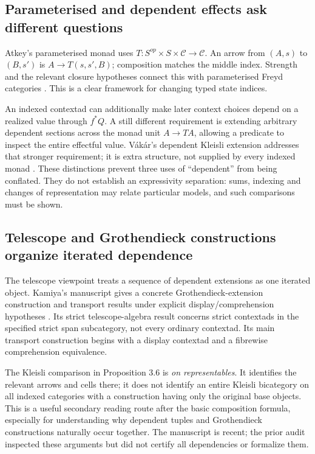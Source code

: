 \documentclass[11pt,letterpaper]{article}
\begin{document}
\subsection{Parameterised and dependent effects ask different questions}
Atkey's parameterised monad uses $T:S^{op}\times S\times\mathcal C\to\mathcal C$. An arrow from $(A,s)$ to $(B,s')$ is $A\to T(s,s',B)$; composition matches the middle index. Strength and the relevant closure hypotheses connect this with parameterised Freyd categories \cite[Definition 1, Propositions 1--3, Theorem 1]{Atkey}. This is a clear framework for changing typed state indices.

An indexed contextad can additionally make later context choices depend on a realized value through $f^*Q$. A still different requirement is extending arbitrary dependent sections across the monad unit $A\to TA$, allowing a predicate to inspect the entire effectful value. V\'ak\'ar's dependent Kleisli extension addresses that stronger requirement; it is extra structure, not supplied by every indexed monad \cite[Definition 5.3.2 and Sections 5.3.3.1--5.3.3.3]{Vakar}. These distinctions prevent three uses of ``dependent'' from being conflated. They do not establish an expressivity separation: sums, indexing and changes of representation may relate particular models, and such comparisons must be shown.

\subsection{Telescope and Grothendieck constructions organize iterated dependence}
The telescope viewpoint treats a sequence of dependent extensions as one iterated object. Kamiya's manuscript gives a concrete Grothendieck-extension construction and transport results under explicit display/comprehension hypotheses \cite[Proposition 3.2, Proposition 3.5, Theorem 4.2]{Kamiya}. Its strict telescope-algebra result concerns strict contextads in the specified strict span subcategory, not every ordinary contextad. Its main transport construction begins with a display contextad and a fibrewise comprehension equivalence.

The Kleisli comparison in Proposition 3.6 is \emph{on representables}. It identifies the relevant arrows and cells there; it does not identify an entire Kleisli bicategory on all indexed categories with a construction having only the original base objects. This is a useful secondary reading route after the basic composition formula, especially for understanding why dependent tuples and Grothendieck constructions naturally occur together. The manuscript is recent; the prior audit inspected these arguments but did not certify all dependencies or formalize them.
\end{document}
